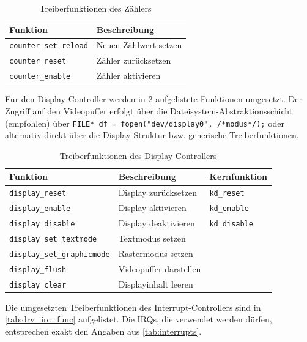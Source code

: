 \begin{table}[!htbp]
	\bigskip
	\centering
	\begin{tabular}{ l | l }
		\textbf{Funktion} & \textbf{Beschreibung} \\
		\hline
		\texttt{counter\_set\_reload} & Neuen Zählwert setzen \\
		\texttt{counter\_reset} & Zähler zurücksetzen \\
		\texttt{counter\_enable} & Zähler aktivieren \\
		\hline
	\end{tabular}
	
	\caption{Treiberfunktionen des Zählers}
	\label{tab:drv_counter_func}
\end{table}

Für den Display-Controller werden in \cref{tab:drv_display_func} aufgelistete Funktionen umgesetzt. Der Zugriff auf den Videopuffer erfolgt über die Dateisystem-Abstraktionsschicht (empfohlen) über  \texttt{FILE* df = fopen("dev/display0", /*modus*/);} oder alternativ direkt über die Display-Struktur bzw. generische Treiberfunktionen. 

\begin{table}[!htbp]
	\bigskip
	\centering
	\begin{tabular}{ l | l | l }
		\textbf{Funktion} & \textbf{Beschreibung} & \textbf{Kernfunktion} \\
		\hline		
		\texttt{display\_reset} & Display zurücksetzen & \texttt{kd\_reset} \\
		\texttt{display\_enable} & Display aktivieren & \texttt{kd\_enable} \\
		\texttt{display\_disable} & Display deaktivieren & \texttt{kd\_disable}\\
		\texttt{display\_set\_textmode} & Textmodus setzen & \\
		\texttt{display\_set\_graphicmode} & Rastermodus setzen & \\
		\texttt{display\_flush} & Videopuffer darstellen & \\
		\texttt{display\_clear} & Displayinhalt leeren & \\
		\hline
	\end{tabular}
	
	\caption{Treiberfunktionen des Display-Controllers}
	\label{tab:drv_display_func}
\end{table}

Die umgesetzten Treiberfunktionen des Interrupt-Controllers sind in \cref{tab:drv_irc_func} aufgelistet. Die \glspl{IRQ}, die verwendet werden dürfen, entsprechen exakt den Angaben aus \cref{tab:interrupts}.

